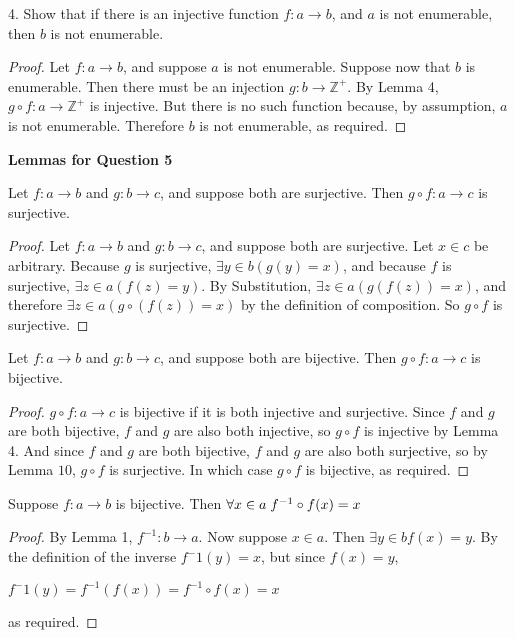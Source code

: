 \documentclass{article}
\begin{document}
4. Show that if there is an injective function $f: a \rightarrow b$, and $a$ is not enumerable, then $b$ is not enumerable.
\begin{proof} Let $f: a \rightarrow b$, and suppose $a$ is not enumerable. Suppose now that $b$ is enumerable. Then there must be an injection $g: b \rightarrow \mathbb{Z^+}$. By Lemma 4, $g \circ f: a \rightarrow \mathbb{Z^+}$ is injective. But there is no such function because, by assumption, $a$ is not enumerable. Therefore $b$ is not enumerable, as required. \end{proof}
\textbf{Lemmas for Question 5}
\begin{lemma} Let $f: a \rightarrow b$ and $g: b \rightarrow c$, and suppose both are surjective. Then $g \circ f: a \rightarrow c$ is surjective. \end{lemma}
\begin{proof} Let $f: a \rightarrow b$ and $g: b \rightarrow c$, and suppose both are surjective. Let $x \in c$ be arbitrary. Because $g$ is surjective, $\exists y \in b(g(y) = x)$, and because $f$ is surjective,  $\exists z \in a(f(z) = y)$. By Substitution, $\exists z \in a(g(f(z)) = x)$, and therefore  $\exists z \in a(g \circ(f(z)) = x)$ by the definition of composition. So $g \circ f$ is surjective. \end{proof}
\begin{lemma} Let $f: a \rightarrow b$ and $g: b \rightarrow c$, and suppose both are bijective. Then $g \circ f: a \rightarrow c$ is bijective. \end{lemma}
\begin{proof} $g \circ f: a \rightarrow c$ is bijective if it is both injective and surjective. Since $f$ and $g$ are both bijective, $f$ and $g$ are also both injective, so $g \circ f$ is injective by Lemma 4. And since $f$ and $g$ are both bijective, $f$ and $g$ are also both surjective, so by Lemma $10$, $g \circ f$ is surjective. In which case $g \circ f$ is bijective, as required. 
\end{proof}
\begin{lemma} Suppose $f: a \rightarrow b$ is bijective. Then $\forall x \in a \hspace{0.1cm} f^{-1} \circ f(x) = x$ \end{lemma}
\begin{proof} By Lemma 1, $f^{-1}: b \rightarrow a$. Now suppose $x \in a$. Then $\exists y \in b f(x) = y$. By the definition of the inverse $f^-1(y) = x$, but since $f(x) = y$, \begin{center}
$f^-1(y) = f^{-1}(f(x)) = f^{-1} \circ f(x) = x$ \end{center} as required. \end{proof}
\end{document}
